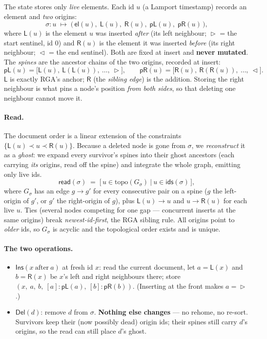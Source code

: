 \documentclass[11pt]{article}
\newcommand{\el}{\mathsf{el}}
\newcommand{\lo}{\mathsf{L}}
\newcommand{\ro}{\mathsf{R}}
\newcommand{\pL}{\mathsf{pL}}
\newcommand{\pR}{\mathsf{pR}}
\newcommand{\ids}{\mathsf{ids}}
\newcommand{\Ins}{\mathsf{Ins}}
\newcommand{\Del}{\mathsf{Del}}
\newcommand{\rd}{\mathsf{read}}
\newcommand{\Start}{\vartriangleright}
\newcommand{\Endd}{\vartriangleleft}
\begin{document}
The state stores only \emph{live} elements. Each id $u$ (a Lamport timestamp)
records an element and \emph{two} origins:
\[
  \sigma : u \;\mapsto\; \bigl(\,\el(u),\; \lo(u),\; \ro(u),\; \pL(u),\; \pR(u)\,\bigr),
\]
where $\lo(u)$ is the element $u$ was inserted \emph{after} (its left neighbour;
$\Start$ = the start sentinel, id $0$) and $\ro(u)$ is the element it was
inserted \emph{before} (its right neighbour; $\Endd$ = the end sentinel). Both
are fixed at insert and \textbf{never mutated}. The \emph{spines} are the
ancestor chains of the two origins, recorded at insert:
\[
  \pL(u) = \bigl[\lo(u),\ \lo(\lo(u)),\ \dots,\ \Start\bigr], \qquad
  \pR(u) = \bigl[\ro(u),\ \ro(\ro(u)),\ \dots,\ \Endd\bigr].
\]
$\lo$ is exactly RGA's anchor; $\ro$ (the \emph{sibling edge}) is the addition.
Storing the right neighbour is what pins a node's position \emph{from both
sides}, so that deleting one neighbour cannot move it.

\paragraph{Read.} The document order is a linear extension of the constraints
$\{\lo(u)\prec u\prec\ro(u)\}$. Because a deleted node is gone from $\sigma$, we
\emph{reconstruct} it as a \emph{ghost}: we expand every survivor's spines into
their ghost ancestors (each carrying \emph{its} origins, read off the spine) and
integrate the whole graph, emitting only live ids.
\[
  \rd(\sigma) \;=\; \bigl[\,u \in \mathrm{topo}(G_\sigma) \ \big|\ u \in \ids(\sigma)\,\bigr],
\]
where $G_\sigma$ has an edge $g\!\to\!g'$ for every consecutive pair on a spine
($g$ the left-origin of $g'$, or $g'$ the right-origin of $g$), plus $\lo(u)\to u$
and $u\to\ro(u)$ for each live $u$. Ties (several nodes competing for one gap ---
concurrent inserts at the same origins) break \emph{newest-id-first}, the RGA
sibling rule. All origins point to \emph{older} ids, so $G_\sigma$ is acyclic and
the topological order exists and is unique.

\paragraph{The two operations.}
\begin{itemize}
  \item $\Ins(x\ \text{after}\ a)$ at fresh id $x$: read the current document,
        let $a=\lo(x)$ and $b=\ro(x)$ be $x$'s left and right neighbours there;
        store $(x,\ a,\ b,\ [a]\!:\!\pL(a),\ [b]\!:\!\pR(b))$. (Inserting at the
        front makes $a=\Start$.)
  \item $\Del(d)$: remove $d$ from $\sigma$. \textbf{Nothing else changes} --- no
        rehome, no re-sort. Survivors keep their (now possibly dead) origin ids;
        their spines still carry $d$'s origins, so the read can still place $d$'s
        ghost.
\end{itemize}
\end{document}

